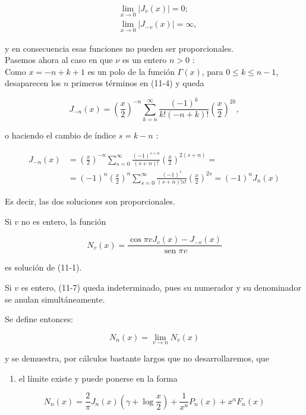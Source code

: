 \documentclass[10pt]{article}
\theoremstyle{plain}
\theoremstyle{definition}
\theoremstyle{remark}
\begin{document}
\begin{align*}
& \lim _{x \rightarrow 0}\left|J_{v}(x)\right|=0 ; \\
& \lim _{x \rightarrow 0}\left|J_{-v}(x)\right|=\infty, \tag{$11\cdot6$}
\end{align*}


y en consecuencia esas funciones no pueden ser proporcionales.\\
Pasemos ahora al caso en que $\nu$ es un entero $n>0$ :\\
Como $x=-n+k+1$ es un polo de la función $\Gamma(x)$, para $0 \leqslant k \leqslant n-1$, desaparecen los $n$ primeros términos en (11-4) y queda

$$
J_{-n}(x)=\left(\frac{x}{2}\right)^{-n} \sum_{k=n}^{\infty} \frac{(-1)^{k}}{k!(-n+k)!}\left(\frac{x}{2}\right)^{2 k},
$$

o haciendo el cambio de índice $s=k-n$ :

$$
\begin{aligned}
J_{-n}(x) & =\left(\frac{x}{2}\right)^{-n} \sum_{s=0}^{\infty} \frac{(-1)^{s+n}}{(s+n)!}\left(\frac{x}{2}\right)^{2(s+n)}= \\
& =(-1)^{n}\left(\frac{x}{2}\right)^{n} \sum_{s=0}^{\infty} \frac{(-1)^{s}}{(s+n)!s!}\left(\frac{x}{2}\right)^{2 s}=(-1)^{n} J_{n}(x)
\end{aligned}
$$

Es decir, las dos soluciones son proporcionales.

Si $v$ no es entero, la función


\begin{equation*}
N_{v}(x)=\frac{\cos \pi v J_{v}(x)-J_{-v}(x)}{\operatorname{sen} \pi v} \tag{11-7}
\end{equation*}


es solución de (11-1).

Si $v$ es entero, (11-7) queda indeterminado, pues su numerador y su denominador se anulan simultáneamente.

Se define entonces:

$$
N_{n}(x)=\lim _{v \rightarrow n} N_{v}(x)
$$

y se demuestra, por cálculos bastante largos que no desarrollaremos, que

\begin{enumerate}
  \item el límite existe y puede ponerse en la forma
\end{enumerate}


\begin{equation*}
N_{n}(x)=\frac{2}{\pi} J_{n}(x)\left(\gamma+\log \frac{x}{2}\right)+\frac{1}{x^{n}} P_{n}(x)+x^{n} F_{n}(x) \tag{11-9}
\end{equation*}
\end{document}
